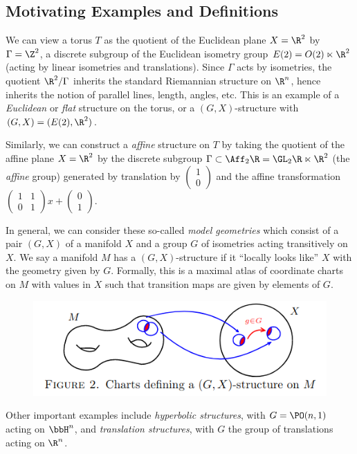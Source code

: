 \documentclass{article}
\begin{document}
\subsection{Motivating Examples and Definitions}
\begin{example}
	We can view a torus $T$ as the quotient of the Euclidean plane $X = \R^2$ by $\Gamma = \Z^2$, a discrete subgroup of the Euclidean isometry group $E(2) = O(2) \ltimes \R^2$ (acting by linear isometries and translations). Since $\Gamma$ acts by isometries, the quotient $\R^2/\Gamma$ inherits the standard Riemannian structure on $\R^n$, hence inherits the notion of parallel lines, length, angles, etc. This is an example of a \textit{Euclidean} or \textit{flat} structure on the torus, or a $(G,X)$-structure with $(G,X) = (E(2), \R^2)$.

	Similarly, we can construct a \textit{affine} structure on $T$ by taking the quotient of the affine plane $X = \R^2$ by the discrete subgroup $\Gamma \subset \Aff_2\R = \GL_2\R \ltimes \R^2$ (the \textit{affine} group) generated by translation by $\begin{pmatrix} 1\\0 \end{pmatrix}$ and the affine transformation $\begin{pmatrix} 1 & 1\\0 & 1 \end{pmatrix}x + \begin{pmatrix} 0\\1 \end{pmatrix}$.

	In general, we can consider these so-called \textit{model geometries} which consist of a pair $(G,X)$ of a manifold $X$ and a group $G$ of isometries acting transitively on $X$. We say a manifold $M$ has a $(G,X)$-structure if it ``locally looks like'' $X$ with the geometry given by $G$. Formally, this is a maximal atlas of coordinate charts on $M$ with values in $X$ such that transition maps are given by elements of $G$.
	\begin{figure}[H]
		\centering
		\includegraphics[scale=0.5]{GX-Charts.png}
	\end{figure}
	Other important examples include \textit{hyperbolic structures}, with $G = \PO(n,1)$ acting on $\bbH^n$, and \textit{translation structures}, with $G$ the group of translations acting on $\R^n$.
\end{example}
\end{document}
